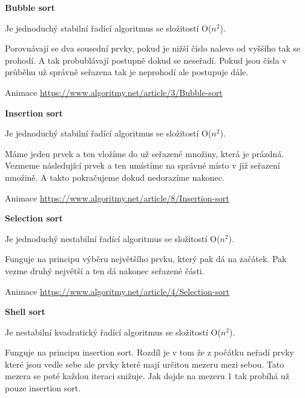 \begin{Large}\vspace{0,5cm} \textbf{Bubble sort}
\end{Large}

Je jednoduchý stabilní řadící algoritmus se složitostí O($n^2$).

Porovnávají se dva sousední prvky, pokud je nižší číslo nalevo od vyššího tak se prohodí. A tak probublávají postupně dokud se neseřadí. Pokud jsou čísla v průběhu už správně seřazena tak je neprohodí ale postupuje dále.

Animace \url{https://www.algoritmy.net/article/3/Bubble-sort}

\begin{Large}\vspace{0,5cm} \textbf{Insertion sort}
\end{Large}

Je jednoduchý stabilní řadící algoritmus se složitostí O($n^2$).

Máme jeden prvek a ten vložíme do už seřazené množiny, která je prázdná. Vezmeme následující prvek a ten umístíme na správné místo v již seřazení množině. A takto pokračujeme dokud nedorazíme nakonec.

Animace \url{https://www.algoritmy.net/article/8/Insertion-sort}

\begin{Large}\vspace{0,5cm} \textbf{Selection sort}
\end{Large}

Je jednoduchý nestabilní řadící algoritmus se složitostí O($n^2$).

Funguje na principu výběru největšího prvku, který pak dá na začátek. Pak vezme druhý největší a ten dá nakonec seřazené části.

Animace \url{https://www.algoritmy.net/article/4/Selection-sort}

\begin{Large}\vspace{0,5cm} \textbf{Shell sort}
\end{Large}

Je nestabilní kvadratický řadící algoritmus se složitostí O($n^2$).

Funguje na principu insertion sort. Rozdíl je v tom že z počátku neřadí prvky které jsou vedle sebe ale prvky které mají určitou mezeru mezi sebou. Tato mezera se poté každou iteraci snižuje. Jak dojde na mezeru 1 tak probíhá už pouze insertion sort.

